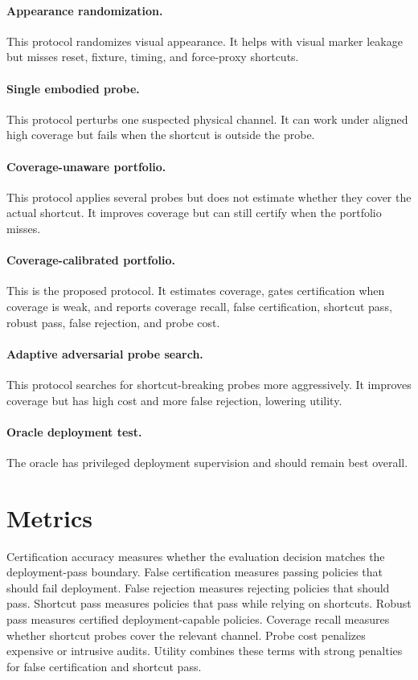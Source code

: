 \documentclass{article}
\begin{document}
\paragraph{Appearance randomization.}
This protocol randomizes visual appearance. It helps with visual marker leakage but misses reset, fixture, timing, and force-proxy shortcuts.

\paragraph{Single embodied probe.}
This protocol perturbs one suspected physical channel. It can work under aligned high coverage but fails when the shortcut is outside the probe.

\paragraph{Coverage-unaware portfolio.}
This protocol applies several probes but does not estimate whether they cover the actual shortcut. It improves coverage but can still certify when the portfolio misses.

\paragraph{Coverage-calibrated portfolio.}
This is the proposed protocol. It estimates coverage, gates certification when coverage is weak, and reports coverage recall, false certification, shortcut pass, robust pass, false rejection, and probe cost.

\paragraph{Adaptive adversarial probe search.}
This protocol searches for shortcut-breaking probes more aggressively. It improves coverage but has high cost and more false rejection, lowering utility.

\paragraph{Oracle deployment test.}
The oracle has privileged deployment supervision and should remain best overall.

\section{Metrics}

Certification accuracy measures whether the evaluation decision matches the deployment-pass boundary. False certification measures passing policies that should fail deployment. False rejection measures rejecting policies that should pass. Shortcut pass measures policies that pass while relying on shortcuts. Robust pass measures certified deployment-capable policies. Coverage recall measures whether shortcut probes cover the relevant channel. Probe cost penalizes expensive or intrusive audits. Utility combines these terms with strong penalties for false certification and shortcut pass.
\end{document}
